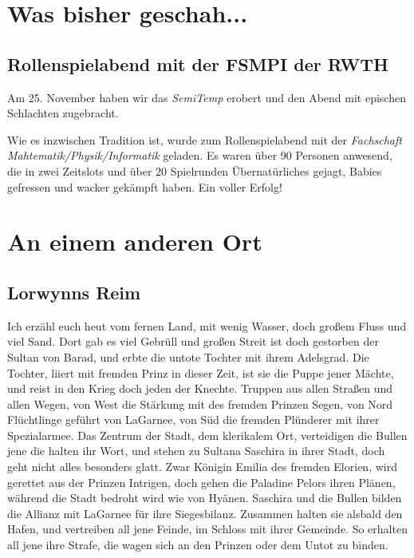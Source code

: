 \documentclass[]{multiversum}
\begin{document}
\makemultititle
%

\section{Was bisher geschah...}

\subsection{Rollenspielabend mit der FSMPI der RWTH}
Am 25. November haben wir das \textit{SemiTemp} erobert und den Abend mit epischen Schlachten zugebracht.

Wie es inzwischen Tradition ist, wurde zum Rollenspielabend mit der \textit{Fachschaft Mahtematik/Physik/Informatik} geladen.
Es waren über 90 Personen anwesend, die in zwei Zeitslots und über 20 Spielrunden Übernatürliches gejagt, Babies gefressen und wacker gekämpft haben.
Ein voller Erfolg!

\section{An einem anderen Ort}

\subsection{Lorwynns Reim}
Ich erzähl euch heut vom fernen Land, mit wenig Wasser, doch großem Fluss und viel Sand.
Dort gab es viel Gebrüll und großen Streit ist doch gestorben der Sultan von Barad, und erbte die untote Tochter mit ihrem Adelsgrad.
Die Tochter, liiert mit fremden Prinz in dieser Zeit, ist sie die Puppe jener Mächte, und reist in den Krieg doch jeden der Knechte.
Truppen aus allen Straßen und allen Wegen, von West die Stärkung mit des fremden Prinzen Segen, von Nord Flüchtlinge geführt von LaGarnee, von Süd die fremden Plünderer mit ihrer Spezialarmee.
Das Zentrum der Stadt, dem klerikalem Ort, verteidigen die Bullen jene die halten ihr Wort, und stehen zu Sultana Saschira in ihrer Stadt, doch geht nicht alles besonders glatt.
Zwar Königin Emilia des fremden Elorien, wird gerettet aus der Prinzen Intrigen, doch gehen die Paladine Pelors ihren Plänen, während die Stadt bedroht wird wie von Hyänen.
Saschira und die Bullen bilden die Allianz mit LaGarnee für ihre Siegesbilanz.
Zusammen halten sie alsbald den Hafen, und vertreiben all jene Feinde, im Schloss mit ihrer Gemeinde.
So erhalten all jene ihre Strafe, die wagen sich an den Prinzen oder dem Untot zu binden.
\end{document}
